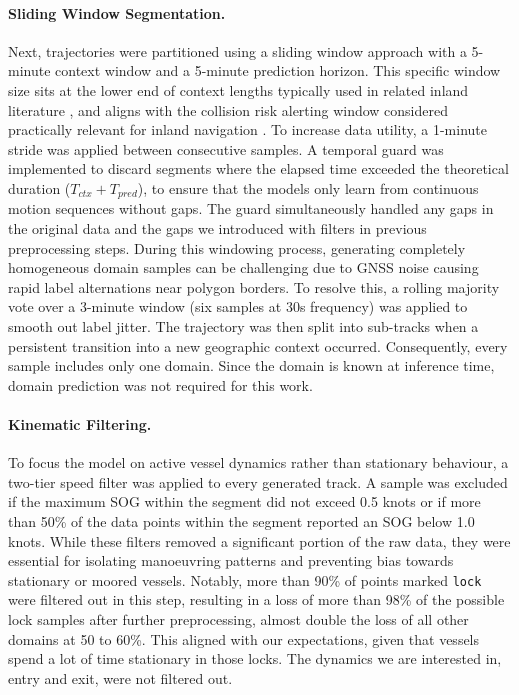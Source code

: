 \paragraph{Sliding Window Segmentation.} 
\label{subsubsec:windowandstride}
Next, trajectories were partitioned using a sliding window approach with a 5-minute context window and a 5-minute prediction horizon. 
This specific window size sits at the lower end of context lengths typically used in related inland literature \parencite{donandt2022shortterm, you2020stseq2seq}, and aligns with the collision risk alerting window considered practically
relevant for inland navigation \parencite{donandt2022shortterm}. 
To increase data utility, a 1-minute stride was applied between consecutive samples.
A temporal guard was implemented to discard segments where the elapsed time exceeded the theoretical duration ($T_{ctx} + T_{pred}$), to ensure that the models only learn from continuous motion sequences without gaps.
The guard simultaneously handled any gaps in the original data and the gaps we introduced with filters in previous preprocessing steps.
During this windowing process, generating completely homogeneous domain samples can be challenging due to \ac{GNSS} noise causing rapid label alternations near polygon borders.
To resolve this, a rolling majority vote over a 3-minute window (six samples at 30s frequency) was applied to smooth out label jitter. The trajectory was then split into sub-tracks when a persistent transition into a new geographic context occurred. Consequently, every sample includes only one domain. Since the domain is known at inference time, domain prediction was not required for this work.


\paragraph{Kinematic Filtering.}
To focus the model on active vessel dynamics rather than stationary behaviour, a two-tier speed filter was applied to every generated track. A sample was excluded if %
the maximum \ac{SOG} within the segment did not exceed 0.5 knots or if more than 50\% of the data points within the segment reported an \ac{SOG} below 1.0 knots.
While these filters removed a significant portion of the raw data, they were essential for isolating manoeuvring patterns and preventing bias towards stationary or moored vessels. %
Notably, more than 90\% of points marked \texttt{lock} were filtered out in this step, %
resulting in a loss of more than 98\% of the possible lock samples after further preprocessing, almost double the loss of all other domains at 50 to 60\%. This aligned with our expectations, given that vessels spend a lot of time stationary in those locks. The dynamics we are interested in, entry and exit, were not filtered out.

